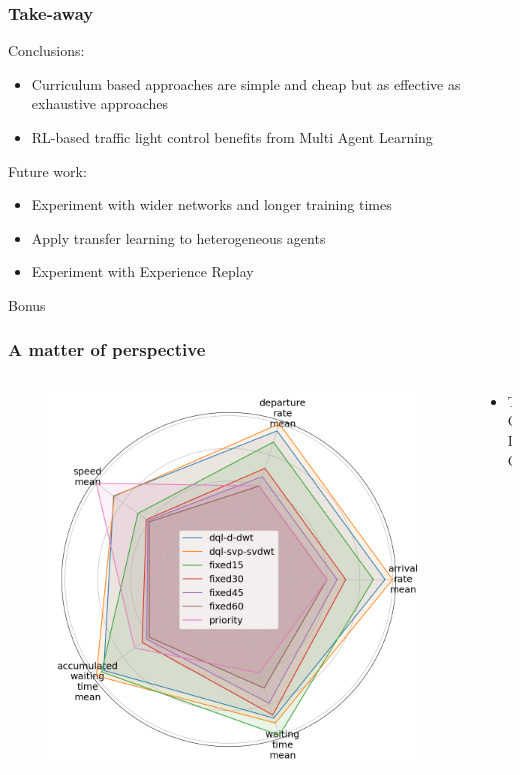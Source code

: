 \documentclass[dvipsnames]{beamer}
\begin{document}
\begin{frame}
  \frametitle{Take-away}
  Conclusions:
  \begin{itemize}
    \item Curriculum based approaches are simple and cheap but as effective as exhaustive approaches
    \item RL-based traffic light control benefits from Multi Agent Learning
  \end{itemize}

  Future work:
  \begin{itemize}
    \item Experiment with wider networks and longer training times
    \item Apply transfer learning to heterogeneous agents
    \item Experiment with Experience Replay
  \end{itemize}
\end{frame}

\begin{frame}
\centering
\Huge
Bonus
\end{frame}

\begin{frame}
\frametitle{A matter of perspective}
  \begin{columns}
  \begin{column}{0.5\textwidth}
    \begin{figure}
      \centering
      \includegraphics[width=1.0\textwidth]{figures/total-radar.png}
    \end{figure}
  \end{column}
  \begin{column}{0.5\textwidth}
    \begin{itemize}
      \item TODO
    \end{itemize}
  \end{column}
\end{columns}
\end{frame}
\end{document}
